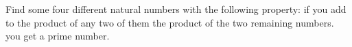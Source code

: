 Find some four different natural numbers with the following property: if you add to the product of any two of them the product of the two remaining numbers. you get a prime number.